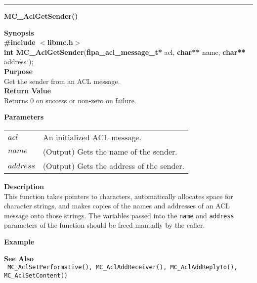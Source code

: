 \noindent
\vspace{5pt}
\rule{6.5in}{0.015in}
\noindent
{}
{\LARGE \bf MC\_AclGetSender()}\\
\label{api:MC_Acl_GetSender()}

\noindent
{\bf Synopsis}\\
{\bf \#include $<$libmc.h$>$}\\
{\bf int MC\_AclGetSender}({\bf fipa\_acl\_message\_t*} acl, {\bf char**} name, {\bf char**} address );\\

\noindent
{\bf Purpose}\\
Get the sender from an ACL message.\\

\noindent
{\bf Return Value}\\
Returns 0 on success or non-zero on failure.

\noindent
{\bf Parameters}
\vspace{-0.1in}
\begin{description}
\item
\begin{tabular}{p{10 mm}p{145 mm}} 
$acl$ & An initialized ACL message. \\
$name$ & (Output) Gets the name of the sender. \\
$address$ & (Output) Gets the address of the sender. 
\end{tabular}
\end{description}

\noindent
{\bf Description}\\
This function takes pointers to characters, automatically allocates space for
character strings, and makes copies of the names and addresses of an ACL message
onto those strings. The variables passed into the \texttt{name} and \texttt{address}
parameters of the function should be freed manually by the caller.

\noindent
{\bf Example}\\
\noindent
{\footnotesize}

\noindent
{\bf See Also}\\
\texttt{
  MC\_AclSetPerformative(), MC\_AclAddReceiver(), MC\_AclAddReplyTo(), 
    \linebreak MC\_AclSetContent()
}

